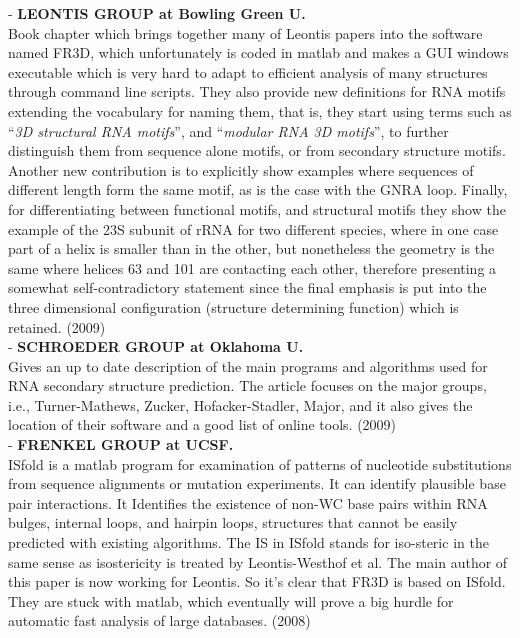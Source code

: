 - \textbf{LEONTIS GROUP at Bowling Green U.}\\
Book chapter which brings together many of Leontis papers into the
software named FR3D, which unfortunately is coded in matlab and makes a
GUI windows executable which is very hard to adapt to efficient
analysis of many structures through command line scripts. They also
provide new definitions for RNA motifs extending the vocabulary for
naming them, that is, they start using terms such as ``\textit{3D structural
RNA motifs}'', and ``\textit{modular RNA 3D motifs}'', to further
distinguish them from sequence alone motifs, or from secondary structure
motifs. Another new contribution is to explicitly show examples where
sequences of different length form the same motif, as is the case with
the GNRA loop. Finally, for differentiating between functional motifs,
and structural motifs they show the example of the 23S subunit of rRNA
for two different species, where in one case part of a helix is
smaller than in the other, but nonetheless the geometry is the same
where helices 63 and 101 are contacting each other, therefore
presenting a somewhat self-contradictory statement since the final
emphasis is put into the three dimensional configuration (structure
determining function) which is retained. (2009)
\cite{nasalean2009}\\

- \textbf{SCHROEDER GROUP at Oklahoma U.}\\
Gives an up to date description of the main programs and algorithms
used for RNA secondary structure prediction. The article focuses on
the major groups, i.e., Turner-Mathews, Zucker, Hofacker-Stadler,
Major, and it also gives the location of their software and a good
list of online tools. (2009)
\cite{schroeder2009}\\

- \textbf{FRENKEL GROUP at UCSF.}\\
ISfold is a matlab program for examination of patterns of nucleotide substitutions
from  sequence   alignments  or  mutation  experiments.  It can
identify plausible base  pair interactions. It Identifies the
existence of non-WC base pairs within RNA  bulges, internal  loops,
and hairpin  loops, structures that cannot be easily
predicted   with   existing algorithms. The IS in ISfold stands for
iso-steric in the same sense as isostericity is treated by Leontis-Westhof et al.
The main author of this paper is now working for Leontis. So it's
clear that FR3D is based on ISfold. They are stuck with matlab, which
eventually will prove a big hurdle for automatic fast analysis of
large databases. (2008)
\cite{mokdad2008}\\

